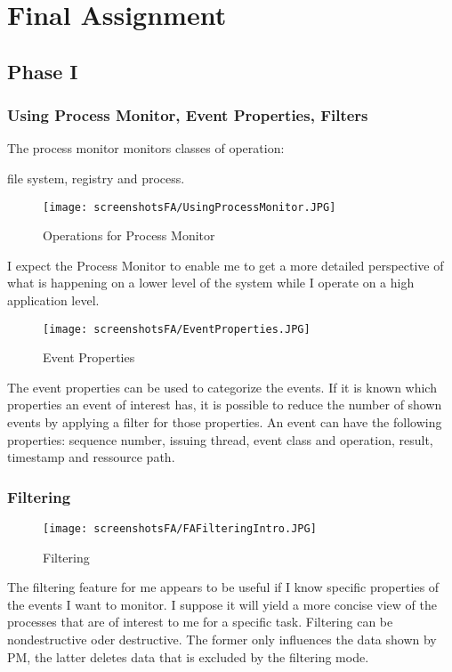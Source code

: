 \documentclass{Gharaei}
\begin{document}
\section{Final Assignment}
\subsection{Phase I}
\subsubsection{Using Process Monitor, Event Properties, Filters}
The process monitor monitors classes of operation:

     file system,
    registry and
     process.
\begin{figure}[H]
    \centering
    \texttt{[image: screenshotsFA/UsingProcessMonitor.JPG]}
    \caption{Operations for Process Monitor}
\end{figure}

I expect the Process Monitor to enable me to get a more detailed perspective of what is happening on a lower level of the system while I operate on a high application level.
\begin{figure}[H]
    \centering
    \texttt{[image: screenshotsFA/EventProperties.JPG]}
    \caption{Event Properties}
\end{figure}

The event properties can be used to categorize the events. If it is known which properties an event of interest has, it is possible to reduce the number of shown events by applying a filter for those properties.
An event can have the following properties: sequence number, issuing thread, event class and operation, result, timestamp and ressource path.




\subsubsection{Filtering}
\begin{figure}[H]
    \centering
    \texttt{[image: screenshotsFA/FAFilteringIntro.JPG]}
    \caption[]{Filtering}
\end{figure}
The filtering feature for me appears to be useful if I know specific properties of the events I want to monitor. I suppose it will yield a more concise view of the processes that are of interest to me for a specific task.
Filtering can be nondestructive oder destructive. The former only influences the data shown by PM, the latter deletes data that is excluded by the filtering mode.
\end{document}
